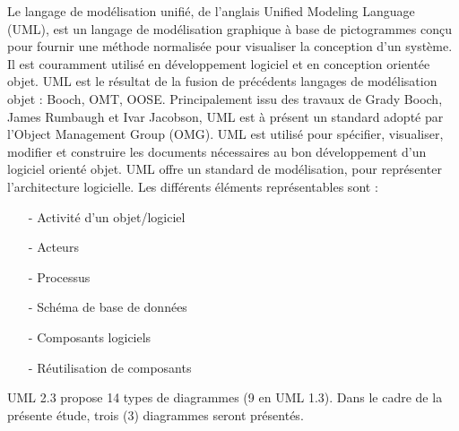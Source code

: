 Le langage de modélisation unifié, de l'anglais Unified Modeling Language (UML), est un langage de modélisation graphique à base de pictogrammes conçu pour fournir une méthode normalisée pour visualiser la conception d'un système. Il est couramment utilisé en développement logiciel et en conception orientée objet.
UML est le résultat de la fusion de précédents langages de modélisation objet : Booch, OMT, OOSE. Principalement issu des travaux de Grady Booch, James Rumbaugh et Ivar Jacobson, UML est à présent un standard adopté par l'Object Management Group (OMG).
UML est utilisé pour spécifier, visualiser, modifier et construire les documents nécessaires au bon développement d'un logiciel orienté objet. UML offre un standard de modélisation, pour représenter l'architecture logicielle. Les différents éléments représentables sont :
\begin{itemize}
	\item[-]Activité d'un objet/logiciel
    \item[-]Acteurs
    \item[-]Processus
    \item[-]Schéma de base de données
    \item[-]Composants logiciels
    \item[-]Réutilisation de composants
\end{itemize}

UML 2.3 propose 14 types de diagrammes (9 en UML 1.3). Dans le cadre de la présente étude, trois (3) diagrammes seront présentés.
